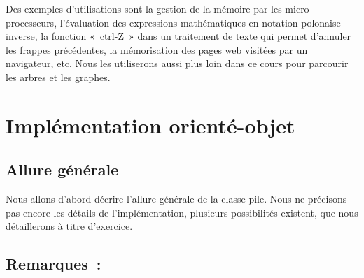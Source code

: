	Des exemples d'utilisations sont la gestion de la mémoire 
	par les micro-processeurs, l'évaluation des expressions
	mathématiques en notation polonaise inverse, la fonction 
	«~ctrl-Z~» dans un traitement de texte qui permet d'annuler
	les frappes précédentes, la mémorisation des pages web visitées 
	par un navigateur, etc. Nous les utiliserons aussi plus
	loin dans ce cours pour parcourir les arbres et les graphes.


\section{Implémentation orienté-objet}

	\subsection{Allure générale}
		
		Nous allons d'abord décrire l'allure générale de la 
		classe pile. Nous ne précisons pas encore les détails de
		l'implémentation, plusieurs possibilités existent, 
		que nous détaillerons à titre d'exercice.

		
	\subsection{Remarques~:}
		

